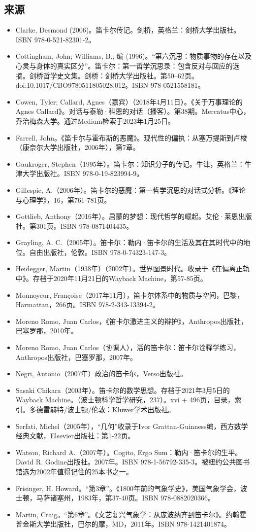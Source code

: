 \subsection{来源}
\begin{itemize}
\item Clarke, Desmond (2006)。笛卡尔传记。剑桥，英格兰：剑桥大学出版社。ISBN 978-0-521-82301-2。
\item Cottingham, John; Williams, B., 编 (1996)。“第六沉思：物质事物的存在以及心灵与身体的真实区分”。笛卡尔：第一哲学沉思录：包含反对与回应的选摘。剑桥哲学史文集。剑桥：剑桥大学出版社。第50–62页。doi:10.1017/CBO9780511805028.012。ISBN 978-0521558181。
\item Cowen, Tyler; Callard, Agnes（嘉宾）（2018年4月11日）。《关于万事理论的Agnes Callard》。对话与泰勒·科恩的对话（播客）。第38期。Mercatus中心，乔治梅森大学。通过Medium检索于2023年1月25日。
\item Farrell, John。《笛卡尔与霍布斯的恶魔》。现代性的偏执：从塞万提斯到卢梭（康奈尔大学出版社，2006年），第7章。
\item Gaukroger, Stephen（1995年）。笛卡尔：知识分子的传记。牛津，英格兰：牛津大学出版社。ISBN 978-0-19-823994-9。
\item Gillespie, A.（2006年）。笛卡尔的恶魔：第一哲学沉思的对话式分析。《理论与心理学》，16，第761-781页。
\item Gottlieb, Anthony（2016年）。启蒙的梦想：现代哲学的崛起。艾伦·莱恩出版社。第301页。ISBN 978-0871404435。
\item Grayling, A. C.（2005年）。笛卡尔：勒内·笛卡尔的生活及其在其时代中的地位。自由出版社，伦敦。ISBN 978-0-74323-147-3。
\item Heidegger, Martin（1938年）（2002年）。世界图景时代。收录于《在偏离正轨中》。存档于2020年11月21日的Wayback Machine，第57-85页。
\item Monnoyeur, Françoise（2017年11月），笛卡尔体系中的物质与空间，巴黎，Harmattan，266页。ISBN 978-2-343-13394-2。
\item Moreno Romo, Juan Carlos，《笛卡尔激进主义的辩护》，Anthropos出版社，巴塞罗那，2010年。
\item Moreno Romo, Juan Carlos（协调人），活的笛卡尔：笛卡尔诠释学练习，Anthropos出版社，巴塞罗那，2007年。
\item Negri, Antonio（2007年）政治的笛卡尔，Verso出版社。
\item Sasaki Chikara（2003年）。笛卡尔的数学思想。存档于2021年3月5日的Wayback Machine。（波士顿科学哲学研究，237）。xvi + 496页，目录，索引。多德雷赫特/波士顿/伦敦：Kluwer学术出版社。
\item Serfati, Michel（2005年），“几何”收录于Ivor Grattan-Guinness编，西方数学经典文献，Elsevier出版社：第1-22页。
\item Watson, Richard A.（2007年）。Cogito, Ergo Sum：勒内·笛卡尔的生平。David R. Godine出版社。2007年。ISBN 978-1-56792-335-3。被纽约公共图书馆选为2002年值得记住的25本书之一。
\item Frisinger, H. Howard。“第3章”。《1800年前的气象学史》，美国气象学会，波士顿，马萨诸塞州，1983年，第37-40页。ISBN 978-0882020366。
\item Martin, Craig。“第6章”。《文艺复兴气象学：从庞波纳齐到笛卡尔》。约翰霍普金斯大学出版社，巴尔的摩，MD，2011年。ISBN 978-1421401874。
\end{itemize}
